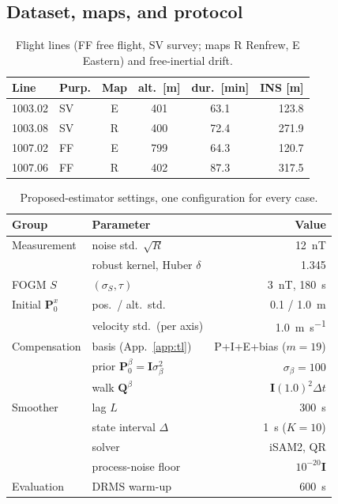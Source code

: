 \documentclass{IEEEtaes}
\begin{document}
\subsection{Dataset, maps, and protocol}\label{sec:protocol}

\begin{table}[t]
\caption{Flight lines (FF free flight, SV survey; maps R Renfrew, E Eastern) and free-inertial drift.}
\label{tab:lines}
\centering
\setlength{\tabcolsep}{4pt}
\begin{tabular}{llcccr}
\toprule
Line & Purp. & Map & alt.\ [m] & dur.\ [min] & INS [m] \\
\midrule
1003.02 & SV & E & 401 & 63.1 & 123.8 \\
1003.08 & SV & R & 400 & 72.4 & 271.9 \\
1007.02 & FF & E & 799 & 64.3 & 120.7 \\
1007.06 & FF & R & 402 & 87.3 & 317.5 \\
\bottomrule
\end{tabular}
\end{table}

\begin{table}[t]
\caption{Proposed-estimator settings, one configuration for every case.}
\label{tab:params}
\centering
\footnotesize
\setlength{\tabcolsep}{3pt}
\begin{tabular}{@{}llr@{}}
\toprule
Group & Parameter & Value \\
\midrule
Measurement & noise std.\ $\sqrt{R}$ & \SI{12}{\nano\tesla} \\
 & robust kernel, Huber $\delta$ & 1.345 \\
FOGM $S$ & $(\sigma_S,\tau)$ & \SI{3}{\nano\tesla}, \SI{180}{\second} \\
Initial $\mathbf{P}_0^{x}$ & pos.\ / alt.\ std. & \SI{0.1}{} / \SI{1.0}{\meter} \\
 & velocity std.\ (per axis) & \SI{1.0}{\meter\per\second} \\
Compensation & basis (App.~\ref{app:tl}) & P{+}I{+}E{+}bias ($m=19$) \\
 & prior $\mathbf{P}_0^{\beta}=\mathbf{I}\sigma_{\beta}^2$ & $\sigma_{\beta}=100$ \\
 & walk $\mathbf{Q}^{\beta}$ & $\mathbf{I}(1.0)^2\Delta t$ \\
Smoother & lag $L$ & \SI{300}{\second} \\
 & state interval $\Delta$ & \SI{1}{\second} ($K=10$) \\
 & solver & iSAM2, QR \\
 & process-noise floor & $10^{-20}\mathbf{I}$ \\
Evaluation & DRMS warm-up & \SI{600}{\second} \\
\bottomrule
\end{tabular}
\end{table}
\end{document}
